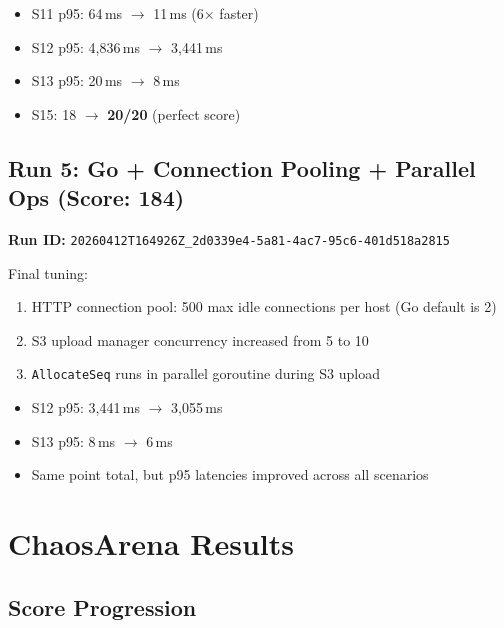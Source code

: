 \documentclass[11pt]{article}
\begin{document}
\begin{itemize}
    \item S11 p95: 64\,ms $\rightarrow$ 11\,ms (6$\times$ faster)
    \item S12 p95: 4,836\,ms $\rightarrow$ 3,441\,ms
    \item S13 p95: 20\,ms $\rightarrow$ 8\,ms
    \item S15: 18 $\rightarrow$ \textbf{20/20} (perfect score)
\end{itemize}

\subsection{Run 5: Go + Connection Pooling + Parallel Ops (Score: 184)}

\textbf{Run ID:} \texttt{20260412T164926Z\_2d0339e4-5a81-4ac7-95c6-401d518a2815}

Final tuning:
\begin{enumerate}
    \item HTTP connection pool: 500 max idle connections per host (Go default is 2)
    \item S3 upload manager concurrency increased from 5 to 10
    \item \texttt{AllocateSeq} runs in parallel goroutine during S3 upload
\end{enumerate}

\begin{itemize}
    \item S12 p95: 3,441\,ms $\rightarrow$ 3,055\,ms
    \item S13 p95: 8\,ms $\rightarrow$ 6\,ms
    \item Same point total, but p95 latencies improved across all scenarios
\end{itemize}

\section{ChaosArena Results}

\subsection{Score Progression}
\end{document}
